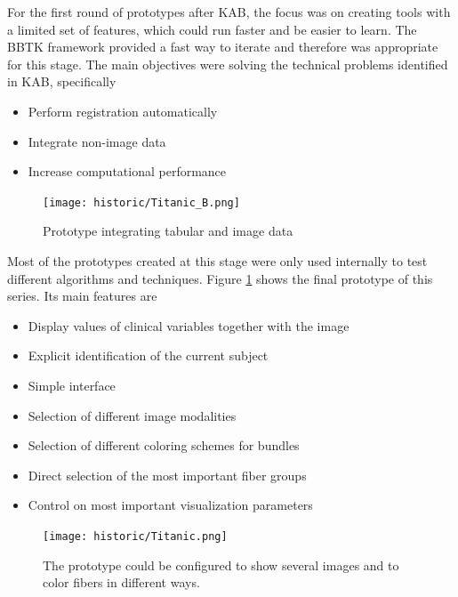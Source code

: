 
For the first round of prototypes after KAB, the focus was on creating tools with a limited set of features, which could run faster and be easier to learn. The BBTK framework provided a fast way to iterate and therefore was appropriate for this stage. The main objectives were solving the technical problems identified in KAB, specifically
\begin{itemize}
\item Perform registration automatically
\item Integrate non-image data
\item Increase computational performance
\end{itemize}

\begin{figure}
\centering
\texttt{[image: historic/Titanic\_B.png]}
\caption{\label{fig_titanic}Prototype integrating tabular and image data}
\end{figure}

Most of the prototypes created at this stage were only used internally to test different algorithms and techniques. Figure \ref{fig_titanic} shows the final prototype of this series. Its main features are
\begin{itemize}
\item Display values of clinical variables together with the image
\item Explicit identification of the current subject
\item Simple interface
\item Selection of different image modalities
\item Selection of different coloring schemes for bundles
\item Direct selection of the most important fiber groups
\item Control on most important visualization parameters
\end{itemize}

\begin{figure}
\centering
\texttt{[image: historic/Titanic.png]}
\caption{\label{fig_titanic_2}The prototype could be configured to show several images and to color fibers in different ways.}
\end{figure}

